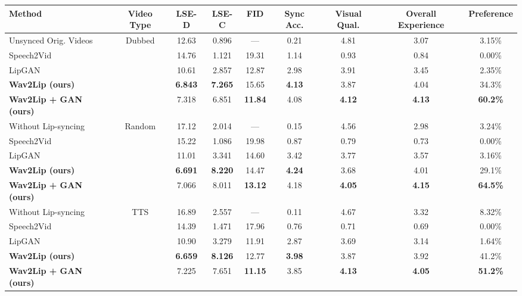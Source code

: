 \documentclass[sigconf]{acmart}
\begin{document}
\begin{table*}[ht]
  \setlength{\tabcolsep}{4pt}
    \centering
    
    \begin{tabular}{|l|c|c|c|c||c|c|c|c|}
    \hline
    
    \textbf{Method} & \textbf{Video Type} & \textbf{LSE-D } & \textbf{LSE-C } & \textbf{FID } & \textbf{Sync Acc.} & \textbf{Visual Qual.} & \textbf{Overall Experience} & \textbf{Preference}\\
    \hline
    Unsynced Orig. Videos & \multirow{5}{*}{Dubbed} & 12.63 & 0.896 & --- & 0.21 & 4.81 & 3.07 & 3.15\% \\
    Speech2Vid~\cite{jamaludin2019you} & & 14.76 & 1.121 & 19.31 & 1.14 & 0.93 & 0.84 & 0.00\% \\
    LipGAN~\cite{kr2019towards} & & 10.61 & 2.857 & 12.87 & 2.98 & 3.91 & 3.45 & 2.35\%\\
    \textbf{Wav2Lip (ours)} & & \textbf{6.843} & \textbf{7.265} & 15.65 & \textbf{4.13} & 3.87 & 4.04 & 34.3\%\\
    \textbf{Wav2Lip + GAN (ours)} & & 7.318 & 6.851 & \textbf{11.84} & 4.08 & \textbf{4.12} & \textbf{4.13} & \textbf{60.2\%}\\
    \hline
    Without Lip-syncing & \multirow{5}{*}{Random} & 17.12 & 2.014 & --- & 0.15 & 4.56 & 2.98 & 3.24\%\\
    Speech2Vid~\cite{jamaludin2019you} & & 15.22 & 1.086 & 19.98 & 0.87 & 0.79 & 0.73 & 0.00\% \\
    LipGAN~\cite{kr2019towards} & & 11.01 & 3.341 & 14.60 & 3.42 & 3.77 & 3.57 & 3.16\%\\
    \textbf{Wav2Lip (ours)} & & \textbf{6.691} & \textbf{8.220} & 14.47 & \textbf{4.24} & 3.68 & 4.01 & 29.1\%\\
    \textbf{Wav2Lip + GAN (ours)} & & 7.066 & 8.011 & \textbf{13.12} & 4.18 & \textbf{4.05} & \textbf{4.15} & \textbf{64.5\%}\\
    \hline
    Without Lip-syncing & \multirow{6}{*}{TTS} & 16.89 & 2.557 & --- & 0.11 & 4.67 & 3.32 & 8.32\% \\
    Speech2Vid~\cite{jamaludin2019you} & & 14.39 & 1.471 & 17.96 & 0.76 & 0.71 & 0.69 & 0.00\%\\
    LipGAN~\cite{kr2019towards} & & 10.90 & 3.279 & 11.91 & 2.87 & 3.69 & 3.14 & 1.64\%\\
    \textbf{Wav2Lip (ours)} & & \textbf{6.659} & \textbf{8.126} & 12.77 & \textbf{3.98} & 3.87 & 3.92 & 41.2\%\\
    \textbf{Wav2Lip + GAN (ours)} & & 7.225 & 7.651 & \textbf{11.15} & 3.85 & \textbf{4.13} & \textbf{4.05} & \textbf{51.2\%}\\

\end{tabular}
\end{table*}
\end{document}
